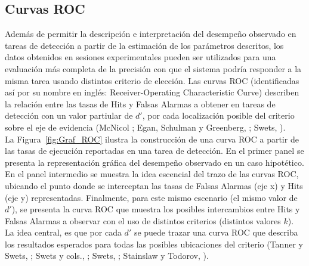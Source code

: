 \subsection{Curvas ROC}

Además de permitir la descripción e interpretación del desempeño observado en tareas de detección a partir de la estimación de los parámetros descritos, los datos obtenidos en sesiones experimentales pueden ser utilizados para una evaluación más completa de la precisión con que el sistema podría responder a la misma tarea usando distintos criterio de elección. Las curvas ROC (identificadas así por su nombre en inglés: Receiver-Operating Characteristic Curve) describen la relación entre las tasas de Hits y Falsas Alarmas a obtener en tareas de detección con un valor partiular de $d'$, por cada localización posible del criterio sobre el eje de evidencia (McNicol \citeyear{McNicol2}; Egan, Schulman y Greenberg, \citeyear{Egan1959}; Swets, \citeyear{Swets1973}).\\

La Figura~\ref{fig:Graf_ROC} ilustra la construcción de una curva ROC a partir de las tasas de ejecución reportadas en una tarea de detección. En el primer panel se presenta la representación gráfica del desempeño observado en un caso hipotético. En el panel intermedio se muestra la idea escencial del trazo de las curvas ROC, ubicando el punto donde se interceptan las tasas de Falsas Alarmas (eje x) y Hits (eje y) representadas. Finalmente, para este mismo escenario (el mismo valor de $d'$), se presenta la curva ROC que muestra los posibles intercambios entre Hits y Falsas Alarmas a observar con el uso de distintos criterios (distintos valores $k$). La idea central, es que por cada $d'$ se puede trazar una curva ROC que describa los resultados esperados para todas las posibles ubicaciones del criterio (Tanner y Swets, \citeyear{Tanner1954}; Swets y cols.,  \citeyear{Swets1961}; Swets, \citeyear{Swets1973}; Stainslaw y Todorov, \citeyear{Stainslaw1999}).\\

